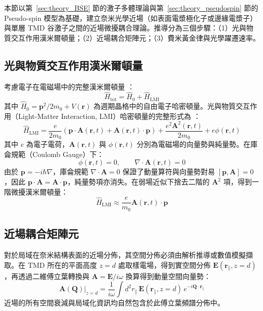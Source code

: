 本節以第~\ref{sec:theory_BSE} 節的激子多體理論與第~\ref{sec:theory_pseudospin} 節的 Pseudo-spin 模型為基礎，建立奈米光學近場（如表面電漿極化子或邊緣電漿子）與單層 TMD 谷激子之間的近場微擾耦合理論。推導分為三個步驟：（1）光與物質交互作用漢米爾頓量；（2）近場耦合矩陣元；（3）費米黃金律與光學躍遷速率。

\subsection{光與物質交互作用漢米爾頓量}

考慮電子在電磁場中的完整漢米爾頓量 \cite{Loudon2000,Fox2001}：
\begin{equation}
	\hat{H}_{\text{tot}} = \hat{H}_0 + \hat{H}_{\text{LMI}}
\end{equation}
其中 $\hat{H}_0 = \mathbf{p}^2/2m_0 + V(\mathbf{r})$ 為週期晶格中的自由電子哈密頓量。光與物質交互作用（Light-Matter Interaction, LMI）哈密頓量的完整形式為 \cite{Weiner2008}：
\begin{equation}
	\hat{H}_{\text{LMI}} = \frac{e}{2m_0} \left( \mathbf{p} \cdot \mathbf{A}(\mathbf{r}, t) + \mathbf{A}(\mathbf{r}, t) \cdot \mathbf{p} \right) + \frac{e^2 \mathbf{A}^2(\mathbf{r}, t)}{2m_0} + e\phi(\mathbf{r}, t)
\end{equation}
其中 $e$ 為電子電荷，$\mathbf{A}(\mathbf{r}, t)$ 與 $\phi(\mathbf{r}, t)$ 分別為電磁場的向量勢與純量勢。在庫侖規範（Coulomb Gauge）下：
\begin{equation}
	\phi(\mathbf{r}, t) = 0, \qquad \nabla \cdot \mathbf{A}(\mathbf{r}, t) = 0
\end{equation}
由於 $\mathbf{p} = -i\hbar\nabla$，庫侖規範 $\nabla \cdot \mathbf{A} = 0$ 保證了動量算符與向量勢對易 $[\mathbf{p}, \mathbf{A}] = 0$，因此 $\mathbf{p} \cdot \mathbf{A} = \mathbf{A} \cdot \mathbf{p}$，純量勢項亦消失。在弱場近似下捨去二階的 $\mathbf{A}^2$ 項，得到一階微擾漢米爾頓量：
\begin{equation}
	\hat{H}_{\text{LMI}} \approx \frac{e}{m_0} \mathbf{A}(\mathbf{r}, t) \cdot \mathbf{p}
	\label{eq:H_LMI}
\end{equation}

\subsection{近場耦合矩陣元}

對於局域在奈米結構表面的近場分佈，其空間分佈必須由解析推導或數值模擬擷取。在 TMD 所在的平面高度 $z = d$ 處取樣電場，得到實空間分佈 $\mathbf{E}(\mathbf{r}_{\parallel}, z=d)$，再透過二維傅立葉轉換與 $\mathbf{A} = \mathbf{E}/i\omega$ 換算得到動量空間向量勢：
\begin{equation}
	\mathbf{A}(\mathbf{Q})\big|_{z=d}
	= \frac{1}{i\omega} \int d^2r_{\parallel}\,
	\mathbf{E}(\mathbf{r}_{\parallel}, z=d)\,
	e^{-i\mathbf{Q}\cdot\mathbf{r}_{\parallel}}
	\label{eq:A_nearfield_fourier}
\end{equation}
近場的所有空間衰減與局域化資訊均自然包含於此傅立葉頻譜分佈中。

